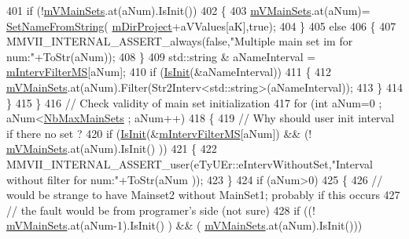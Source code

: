 \begin{DoxyCode}
401          \textcolor{keywordflow}{if} (!\hyperlink{classMMVII_1_1cMMVII__Appli_a092463147c8cde58a2eb1ec1147121a3}{mVMainSets}.at(aNum).IsInit())
402          \{
403             \hyperlink{classMMVII_1_1cMMVII__Appli_a092463147c8cde58a2eb1ec1147121a3}{mVMainSets}.at(aNum)= \hyperlink{uti__set__sel_8cpp_abf9e50e7d577e50f5c31fe2953305f0e}{SetNameFromString}(
      \hyperlink{classMMVII_1_1cMMVII__Appli_ac499a1136b5261fb82e1ac0fb9632fdc}{mDirProject}+aVValues[aK],\textcolor{keyword}{true});
404          \}
405          \textcolor{keywordflow}{else}
406          \{
407             MMVII\_INTERNAL\_ASSERT\_always(\textcolor{keyword}{false},\textcolor{stringliteral}{"Multiple main set im for num:"}+ToStr(aNum));
408          \}
409          std::string & aNameInterval = \hyperlink{classMMVII_1_1cMMVII__Appli_ac3534cd89df89a254e1b58934c79b328}{mIntervFilterMS}[aNum];
410          \textcolor{keywordflow}{if} (\hyperlink{classMMVII_1_1cMMVII__Appli_a3363a4afe1f4f43e28df0799ab31149a}{IsInit}(&aNameInterval))
411          \{
412              \hyperlink{classMMVII_1_1cMMVII__Appli_a092463147c8cde58a2eb1ec1147121a3}{mVMainSets}.at(aNum).Filter(Str2Interv<std::string>(aNameInterval));
413          \}
414       \}
415   \}
416   \textcolor{comment}{// Check validity of main set initialization}
417   \textcolor{keywordflow}{for} (\textcolor{keywordtype}{int} aNum=0 ; aNum<\hyperlink{classMMVII_1_1cMMVII__Appli_a819abde678fbc53402c9bc10ba8ef7f4}{NbMaxMainSets} ; aNum++)
418   \{
419       \textcolor{comment}{// Why should user init interval if there no set ?}
420       \textcolor{keywordflow}{if} (\hyperlink{classMMVII_1_1cMMVII__Appli_a3363a4afe1f4f43e28df0799ab31149a}{IsInit}(&\hyperlink{classMMVII_1_1cMMVII__Appli_ac3534cd89df89a254e1b58934c79b328}{mIntervFilterMS}[aNum]) && (!  \hyperlink{classMMVII_1_1cMMVII__Appli_a092463147c8cde58a2eb1ec1147121a3}{mVMainSets}.at(aNum).IsInit()
      ))
421       \{
422          MMVII\_INTERNAL\_ASSERT\_user(eTyUEr::eIntervWithoutSet,\textcolor{stringliteral}{"Interval without filter for num:"}+ToStr(aNum
      ));
423       \}
424       \textcolor{keywordflow}{if} (aNum>0)
425       \{
426          \textcolor{comment}{// would be strange to have Mainset2 without MainSet1; probably if this occurs}
427          \textcolor{comment}{// the fault would be from programer's side (not sure)}
428          \textcolor{keywordflow}{if} ((! \hyperlink{classMMVII_1_1cMMVII__Appli_a092463147c8cde58a2eb1ec1147121a3}{mVMainSets}.at(aNum-1).IsInit() ) && ( \hyperlink{classMMVII_1_1cMMVII__Appli_a092463147c8cde58a2eb1ec1147121a3}{mVMainSets}.at(aNum).IsInit()))

\end{DoxyCode}

